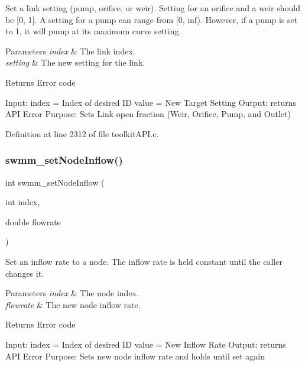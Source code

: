 Set a link setting (pump, orifice, or weir). Setting for an orifice and a weir should be \mbox{[}0, 1\mbox{]}. A setting for a pump can range from \mbox{[}0, inf). However, if a pump is set to 1, it will pump at its maximum curve setting. 


\begin{DoxyParams}{Parameters}
{\em index} & The link index. \\
\hline
{\em setting} & The new setting for the link. \\
\hline
\end{DoxyParams}
\begin{DoxyReturn}{Returns}
Error code
\end{DoxyReturn}
Input\+: index = Index of desired ID value = New Target Setting Output\+: returns A\+PI Error Purpose\+: Sets Link open fraction (Weir, Orifice, Pump, and Outlet) 

Definition at line 2312 of file toolkit\+A\+P\+I.\+c.

\mbox{\label{group__tkfuncs_ga6438a8a45d7712b8b02ba630cd8e1db3}} 
\subsubsection{\texorpdfstring{swmm\_setNodeInflow()}{swmm\_setNodeInflow()}}
{\footnotesize\ttfamily int swmm\+\_\+set\+Node\+Inflow (\begin{DoxyParamCaption}\item[{int}]{index,  }\item[{double}]{flowrate }\end{DoxyParamCaption})}



Set an inflow rate to a node. The inflow rate is held constant until the caller changes it. 


\begin{DoxyParams}{Parameters}
{\em index} & The node index. \\
\hline
{\em flowrate} & The new node inflow rate. \\
\hline
\end{DoxyParams}
\begin{DoxyReturn}{Returns}
Error code
\end{DoxyReturn}
Input\+: index = Index of desired ID value = New Inflow Rate Output\+: returns A\+PI Error Purpose\+: Sets new node inflow rate and holds until set again 

